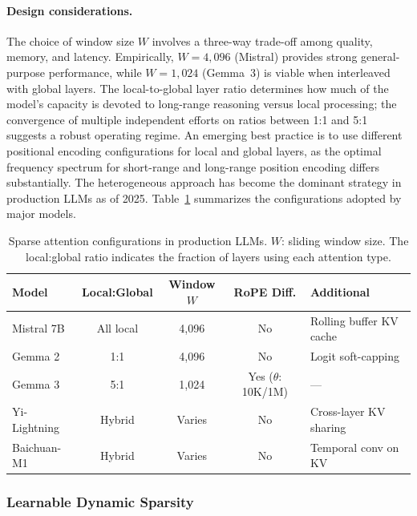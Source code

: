 \paragraph{Design considerations.}
The choice of window size $W$ involves a three-way trade-off among quality, memory, and latency. Empirically, $W = 4{,}096$ (Mistral) provides strong general-purpose performance, while $W = 1{,}024$ (Gemma~3) is viable when interleaved with global layers. The local-to-global layer ratio determines how much of the model's capacity is devoted to long-range reasoning versus local processing; the convergence of multiple independent efforts on ratios between 1:1 and 5:1 suggests a robust operating regime. An emerging best practice is to use different positional encoding configurations for local and global layers, as the optimal frequency spectrum for short-range and long-range position encoding differs substantially. The heterogeneous approach has become the dominant strategy in production LLMs as of 2025. Table~\ref{tab:sparse-production} summarizes the configurations adopted by major models.

\begin{table}[t]
\centering
\caption{Sparse attention configurations in production LLMs. $W$: sliding window size. The local:global ratio indicates the fraction of layers using each attention type.}
\label{tab:sparse-production}
\small
\begin{tabular}{lcccl}
\toprule
\textbf{Model} & \textbf{Local:Global} & \textbf{Window $W$} & \textbf{RoPE Diff.} & \textbf{Additional} \\
\midrule
Mistral 7B     & All local    & 4,096  & No  & Rolling buffer KV cache \\
Gemma 2        & 1:1          & 4,096  & No  & Logit soft-capping \\
Gemma 3        & 5:1          & 1,024  & Yes ($\theta$: 10K/1M) & --- \\
Yi-Lightning   & Hybrid       & Varies & No  & Cross-layer KV sharing \\
Baichuan-M1    & Hybrid       & Varies & No  & Temporal conv on KV \\
\bottomrule
\end{tabular}
\end{table}


\subsubsection{Learnable Dynamic Sparsity}
\label{subsubsec:learnable-sparse}


